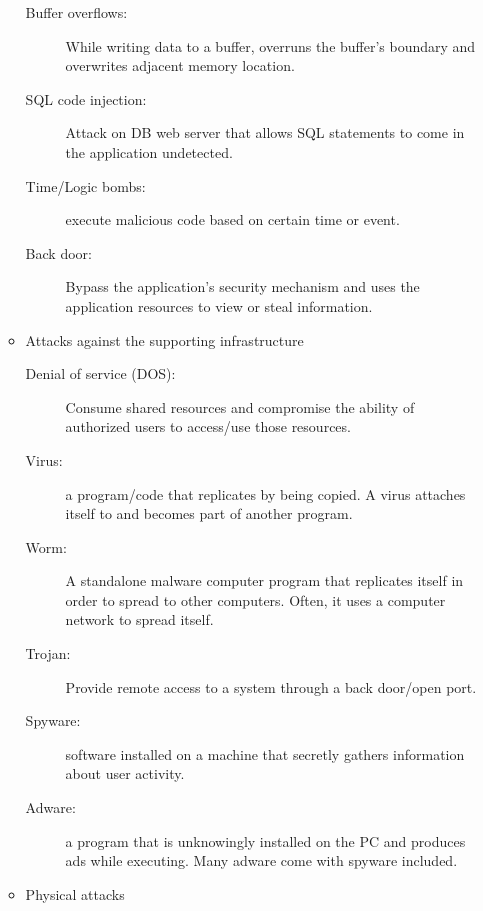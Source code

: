 \documentclass[a4paper]{article}
\begin{document}
\begin{enumerate}
\begin{itemize}
\begin{description}
						\item[Buffer overflows:] While writing data to a buffer,
							overruns the buffer's boundary and overwrites
							adjacent memory location.
						\item[SQL code injection:] Attack on DB web server that
							allows SQL statements to come in the application
							undetected.
						\item[Time/Logic bombs:] execute malicious code based
							on certain time or event.
						\item[Back door:] Bypass the application's security
							mechanism and uses the application resources
							to view or steal information.
					\end{description}
				\item Attacks against the supporting infrastructure
					\begin{description}
						\item[Denial of service (DOS):] Consume shared
							resources and compromise the ability of
							authorized users to access/use those resources.
						\item[Virus:] a program/code that replicates by being
							copied. A virus attaches itself to and becomes
							part of another program.
						\item[Worm:] A standalone malware computer program that
							replicates itself in order to spread to other
							computers. Often, it uses a computer network to
							spread itself.
						\item[Trojan:] Provide remote access to a system through
							a back door/open port.
						\item[Spyware:] software installed on a machine that
							secretly gathers information about user activity.
						\item[Adware:] a program that is unknowingly installed on
							the PC and produces ads while executing. Many
							adware come with spyware included.
					\end{description}
				\item Physical attacks
					

\end{itemize}
\end{enumerate}
\end{document}
